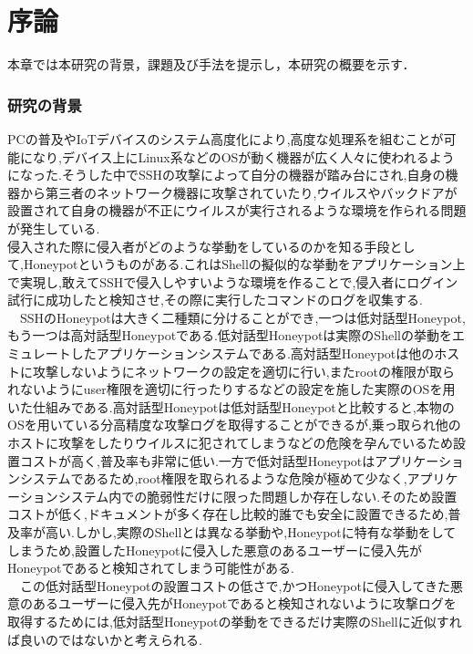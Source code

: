 \chapter{序論}
\label{introduction}

本章では本研究の背景，課題及び手法を提示し，本研究の概要を示す．

\subsection{研究の背景}
\label{introduction:haikei}

PCの普及やIoTデバイスのシステム高度化により,高度な処理系を組むことが可能になり,デバイス上にLinux系などのOSが動く機器が広く人々に使われるようになった.そうした中でSSHの攻撃によって自分の機器が踏み台にされ,自身の機器から第三者のネットワーク機器に攻撃されていたり,ウイルスやバックドアが設置されて自身の機器が不正にウイルスが実行されるような環境を作られる問題が発生している.\\
 侵入された際に侵入者がどのような挙動をしているのかを知る手段として,Honeypotというものがある.これはShellの擬似的な挙動をアプリケーション上で実現し,敢えてSSHで侵入しやすいような環境を作ることで,侵入者にログイン試行に成功したと検知させ,その際に実行したコマンドのログを収集する.\\
\ \ SSHのHoneypotは大きく二種類に分けることができ,一つは低対話型Honeypot,もう一つは高対話型Honeypotである.低対話型Honeypotは実際のShellの挙動をエミュレートしたアプリケーションシステムである.高対話型Honeypotは他のホストに攻撃しないようにネットワークの設定を適切に行い,またrootの権限が取られないようにuser権限を適切に行ったりするなどの設定を施した実際のOSを用いた仕組みである.高対話型Honeypotは低対話型Honeypotと比較すると,本物のOSを用いている分高精度な攻撃ログを取得することができるが,乗っ取られ他のホストに攻撃をしたりウイルスに犯されてしまうなどの危険を孕んでいるため設置コストが高く,普及率も非常に低い.一方で低対話型Honeypotはアプリケーションシステムであるため,root権限を取られるような危険が極めて少なく,アプリケーションシステム内での脆弱性だけに限った問題しか存在しない.そのため設置コストが低く,ドキュメントが多く存在し比較的誰でも安全に設置できるため,普及率が高い.しかし,実際のShellとは異なる挙動や,Honeypotに特有な挙動をしてしまうため,設置したHoneypotに侵入した悪意のあるユーザーに侵入先がHoneypotであると検知されてしまう可能性がある.\\
\ \ この低対話型Honeypotの設置コストの低さで,かつHoneypotに侵入してきた悪意のあるユーザーに侵入先がHoneypotであると検知されないように攻撃ログを取得するためには,低対話型Honeypotの挙動をできるだけ実際のShellに近似すれば良いのではないかと考えられる.\\
